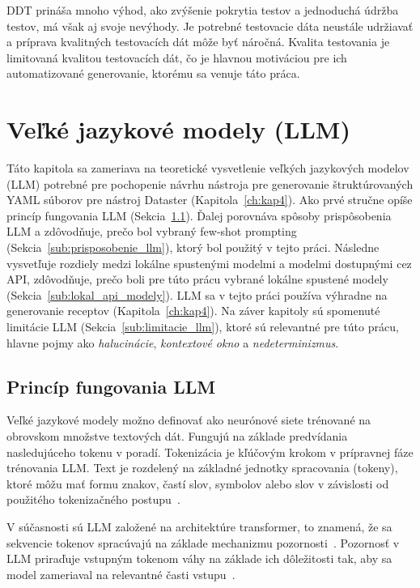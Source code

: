 DDT prináša mnoho výhod, ako zvýšenie pokrytia testov a jednoduchá údržba testov, má však aj svoje nevýhody. Je potrebné testovacie dáta neustále udržiavať a príprava kvalitných testovacích dát môže byť náročná. Kvalita testovania je limitovaná kvalitou testovacích dát, čo je hlavnou motiváciou pre ich automatizované generovanie, ktorému sa venuje táto práca.

\chapter{Veľké jazykové modely (LLM)}
\label{ch:kap3}

Táto kapitola sa zameriava na teoretické vysvetlenie veľkých jazykových modelov (LLM) potrebné pre pochopenie návrhu nástroja pre generovanie štruktúrovaných YAML súborov pre nástroj Dataster (Kapitola~\ref{ch:kap4}). Ako prvé stručne opíše princíp fungovania LLM (Sekcia~\ref{sub:co_je_llm}).  Ďalej porovnáva spôsoby prispôsobenia LLM a zdôvodňuje, prečo bol vybraný few-shot prompting (Sekcia~\ref{sub:prisposobenie_llm}), ktorý bol použitý v tejto práci. Následne vysvetľuje rozdiely medzi lokálne spustenými modelmi a modelmi dostupnými cez API, zdôvodňuje, prečo boli pre túto prácu vybrané lokálne spustené modely (Sekcia~\ref{sub:lokal_api_modely}). LLM sa v tejto práci používa výhradne na generovanie receptov (Kapitola~\ref{ch:kap4}). Na záver kapitoly sú spomenuté limitácie LLM (Sekcia~\ref{sub:limitacie_llm}), ktoré sú relevantné pre túto prácu, hlavne pojmy ako \textit{halucinácie}, \textit{kontextové okno} a \textit{nedeterminizmus}. 

\section{Princíp fungovania LLM}
\label{sub:co_je_llm}

Veľké jazykové modely možno definovať ako neurónové siete trénované na obrovskom množstve textových dát. Fungujú na základe predvídania nasledujúceho tokenu v poradí. Tokenizácia je kľúčovým krokom v prípravnej fáze trénovania LLM. Text je rozdelený na základné jednotky spracovania (tokeny), ktoré môžu mať formu znakov, častí slov, symbolov alebo slov v závislosti od použitého tokenizačného postupu~\cite{Naveed2024}. 


V súčasnosti sú LLM založené na architektúre transformer, to znamená, že sa sekvencie tokenov spracúvajú na základe mechanizmu pozornosti~\cite{Vaswani2017}. Pozornosť v LLM priraďuje vstupným tokenom váhy na základe ich dôležitosti tak, aby sa model zameriaval na relevantné časti vstupu~\cite{Naveed2024}.


